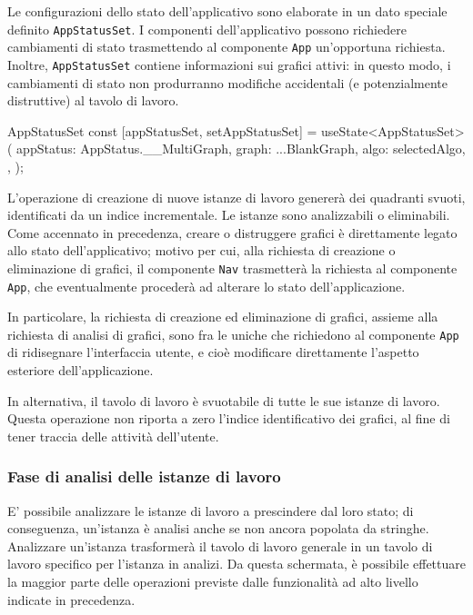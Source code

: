 Le configurazioni dello stato dell'applicativo sono elaborate in un dato speciale definito \verb|AppStatusSet|. I componenti dell'applicativo possono richiedere cambiamenti di stato trasmettendo al componente \verb|App| un'opportuna richiesta. Inoltre, \verb|AppStatusSet| contiene informazioni sui grafici attivi: in questo modo, i cambiamenti di stato non produrranno modifiche accidentali (e potenzialmente distruttive) al tavolo di lavoro.

\begin{sexylisting}{AppStatusSet}
const [appStatusSet, setAppStatusSet] = 
  useState<AppStatusSet>({
    appStatus: AppStatus.__MultiGraph,
    graph: {
      ...BlankGraph,
	  algo: selectedAlgo,
    },
  });
\end{sexylisting}

\vspace{3mm}

L'operazione di creazione di nuove istanze di lavoro genererà dei quadranti svuoti, identificati da un indice incrementale. Le istanze sono analizzabili o eliminabili. Come accennato in precedenza, creare o distruggere grafici è direttamente legato allo stato dell'applicativo; motivo per cui, alla richiesta di creazione o eliminazione di grafici, il componente \verb|Nav| trasmetterà la richiesta al componente \verb|App|, che eventualmente procederà ad alterare lo stato dell'applicazione. 

\vspace{3mm}

In particolare, la richiesta di creazione ed eliminazione di grafici, assieme alla richiesta di analisi di grafici, sono fra le uniche che richiedono al componente \verb|App| di ridisegnare l'interfaccia utente, e cioè modificare direttamente l'aspetto esteriore dell'applicazione.

\vspace{3mm}

In alternativa, il tavolo di lavoro è svuotabile di tutte le sue istanze di lavoro. Questa operazione non riporta a zero l'indice identificativo dei grafici, al fine di tener traccia delle attività dell'utente.

\subsubsection{Fase di analisi delle istanze di lavoro}

E' possibile analizzare le istanze di lavoro a prescindere dal loro stato; di conseguenza, un'istanza è analisi anche se non ancora popolata da stringhe. Analizzare un'istanza trasformerà il tavolo di lavoro generale in un tavolo di lavoro specifico per l'istanza in analizi. Da questa schermata, è possibile effettuare la maggior parte delle operazioni previste dalle funzionalità ad alto livello indicate in precedenza.

